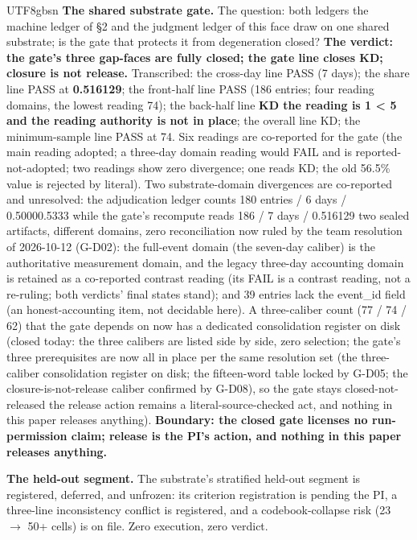 \documentclass[11pt,letterpaper]{article}
\begin{document}
\begin{CJK}{UTF8}{gbsn}
\textbf{The shared substrate gate.} The question: both ledgers \textemdash{} the machine ledger of \S{}2 and the judgment ledger of this face \textemdash{} draw on one shared substrate; is the gate that protects it from degeneration closed? \textbf{The verdict: the gate's three gap-faces are fully closed; the gate line closes KD; closure is not release.} Transcribed: the cross-day line PASS (7 days); the share line PASS at \textbf{0.516129}; the front-half line PASS (186 entries; four reading domains, the lowest reading 74); the back-half line \textbf{KD \textemdash{} the reading is 1 < 5 and the reading authority is not in place}; the overall line KD; the minimum-sample line PASS at 74. Six readings are co-reported for the gate (the main reading adopted; a three-day domain reading would FAIL and is reported-not-adopted; two readings show zero divergence; one reads KD; the old 56.5\% value is rejected by literal). Two substrate-domain divergences are co-reported and unresolved: the adjudication ledger counts 180 entries / 6 days / 0.5000\textendash{}0.5333 while the gate's recompute reads 186 / 7 days / 0.516129 \textemdash{} two sealed artifacts, different domains, zero reconciliation \textemdash{} now ruled by the team resolution of 2026-10-12 (G-D02): the full-event domain (the seven-day caliber) is the authoritative measurement domain, and the legacy three-day accounting domain is retained as a co-reported contrast reading (its FAIL is a contrast reading, not a re-ruling; both verdicts' final states stand); and 39 entries lack the event\_id field (an honest-accounting item, not decidable here). A three-caliber count (77 / 74 / 62) that the gate depends on now has a dedicated consolidation register on disk (closed today: the three calibers are listed side by side, zero selection; the gate's three prerequisites are now all in place per the same resolution set (the three-caliber consolidation register on disk; the fifteen-word table locked by G-D05; the closure-is-not-release caliber confirmed by G-D08), so the gate stays closed-not-released \textemdash{} the release action remains a literal-source-checked act, and nothing in this paper releases anything). \textbf{Boundary: the closed gate licenses no run-permission claim; release is the PI's action, and nothing in this paper releases anything.}

\textbf{The held-out segment.} The substrate's stratified held-out segment is registered, deferred, and unfrozen: its criterion registration is pending the PI, a three-line inconsistency conflict is registered, and a codebook-collapse risk (23 \ensuremath{\to} 50+ cells) is on file. Zero execution, zero verdict.


\end{CJK}
\end{document}
